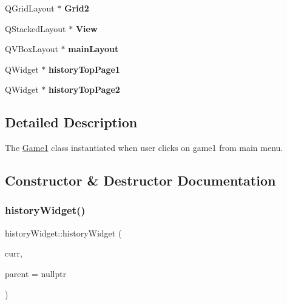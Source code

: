 \begin{DoxyCompactItemize}
Q\+Grid\+Layout $\ast$ {\bfseries Grid2}
\item 
\mbox{\label{classhistoryWidget_ac35321a6d1f75ff114bd66afa419c576}} 
Q\+Stacked\+Layout $\ast$ {\bfseries View}
\item 
\mbox{\label{classhistoryWidget_a08255f6e30326998f3bedb9ed50b5969}} 
Q\+V\+Box\+Layout $\ast$ {\bfseries main\+Layout}
\item 
\mbox{\label{classhistoryWidget_ae24bf641bb918fb645f3c97a7b7f9ae3}} 
Q\+Widget $\ast$ {\bfseries history\+Top\+Page1}
\item 
\mbox{\label{classhistoryWidget_a01a91e2dd757fc2e5aeba492eebbb0dc}} 
Q\+Widget $\ast$ {\bfseries history\+Top\+Page2}
\end{DoxyCompactItemize}


\subsection{Detailed Description}
The \hyperlink{classGame1}{Game1} class instantiated when user clicks on game1 from main menu. 

\subsection{Constructor \& Destructor Documentation}
\mbox{\label{classhistoryWidget_a0843e5d5c3c766bcdb3307fe00eb816a}} 
\subsubsection{\texorpdfstring{history\+Widget()}{historyWidget()}}
{\footnotesize\ttfamily history\+Widget\+::history\+Widget (\begin{DoxyParamCaption}\item[{\hyperlink{classAccounts}{Accounts} $\ast$}]{curr,  }\item[{Q\+Widget $\ast$}]{parent = {\ttfamily nullptr} }\end{DoxyParamCaption})\hspace{0.3cm}{\ttfamily [explicit]}}



